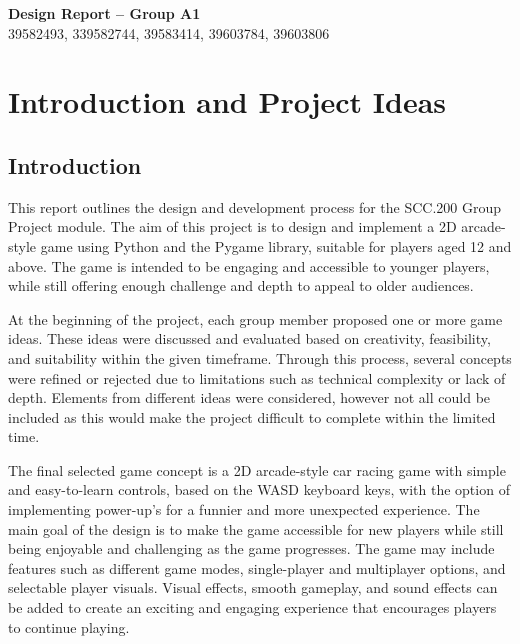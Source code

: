 \documentclass[12pt]{article}
\author{39603806 (LaTeX Author), 39603784, 39583414, 339582744, 39582493}
\date{12.02.2026}
\begin{document}
\pagestyle{fancy}
\fancyhead[C]{}
\renewcommand{\headrulewidth}{0.4pt}
\renewcommand{\footrulewidth}{2pt}

\noindent\textbf{\Large{Design Report -- Group A1}}\\
39582493, 339582744, 39583414, 39603784, 39603806
\setcounter{tocdepth}{3}
\tableofcontents

\section{Introduction and Project Ideas}

\subsection{Introduction}

This report outlines the design and development process for the SCC.200 Group Project module. The aim of this project is to design and implement a 2D arcade-style game using Python and the Pygame library, suitable for players aged 12 and above.\parencite{python,pygame} The game is intended to be engaging and accessible to younger players, while still offering enough challenge and depth to appeal to older audiences.

At the beginning of the project, each group member proposed one or more game ideas. These ideas were discussed and evaluated based on creativity, feasibility, and suitability within the given timeframe. Through this process, several concepts were refined or rejected due to limitations such as technical complexity or lack of depth. Elements from different ideas were considered, however not all could be included as this would make the project difficult to complete within the limited time.

The final selected game concept is a 2D arcade-style car racing game with simple and easy-to-learn controls, based on the WASD keyboard keys, with the option of implementing power-up’s for a funnier and more unexpected experience. The main goal of the design is to make the game accessible for new players while still being enjoyable and challenging as the game progresses. The game may include features such as different game modes, single-player and multiplayer options, and selectable player visuals. Visual effects, smooth gameplay, and sound effects can be added to create an exciting and engaging experience that encourages players to continue playing.
\end{document}
